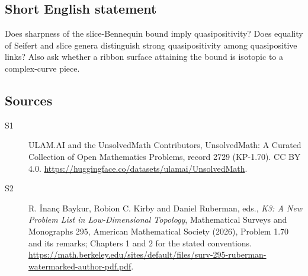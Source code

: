 \documentclass[11pt]{article}
\begin{document}
\subsection{Short English statement}
Does sharpness of the slice-Bennequin bound imply quasipositivity? Does equality of Seifert and slice genera distinguish strong quasipositivity among quasipositive links? Also ask whether a ribbon surface attaining the bound is isotopic to a complex-curve piece.
\subsection{Sources}
\begin{description}
\item[\hypertarget{source:2729:1}{S1}] ULAM.AI and the UnsolvedMath Contributors, UnsolvedMath: A Curated Collection of Open Mathematics Problems, record 2729 (KP-1.70). CC BY 4.0. \url{https://huggingface.co/datasets/ulamai/UnsolvedMath}.
\item[\hypertarget{source:2729:2}{S2}] R. İnanç Baykur, Robion C. Kirby and Daniel Ruberman, eds., \emph{K3: A New Problem List in Low-Dimensional Topology}, Mathematical Surveys and Monographs 295, American Mathematical Society (2026), Problem 1.70 and its remarks; Chapters 1 and 2 for the stated conventions. \url{https://math.berkeley.edu/sites/default/files/surv-295-ruberman-watermarked-author-pdf.pdf}.
\end{description}
\label{end:2729}
\end{document}

